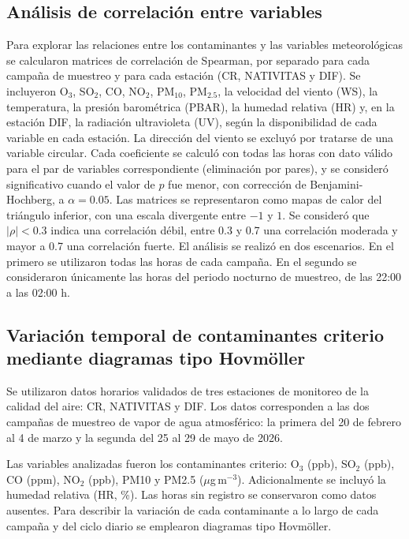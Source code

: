\subsection{Análisis de correlación entre variables}
\label{subsec:correlacion}

Para explorar las relaciones entre los contaminantes y las variables meteorológicas se 
calcularon matrices de correlación de Spearman, por separado para cada campaña de muestreo 
y para cada estación (CR, NATIVITAS y DIF). Se incluyeron O$_3$, SO$_2$, CO, NO$_2$,
PM$_{10}$, PM$_{2.5}$, la velocidad del viento (WS), la temperatura, la presión barométrica
(PBAR), la humedad relativa (HR) y, en la estación DIF, la radiación ultravioleta
(UV), según la disponibilidad de cada variable en cada estación. La dirección del 
viento se excluyó por tratarse de una variable circular. Cada coeficiente se calculó 
con todas las horas con dato válido para el par de variables correspondiente 
(eliminación por pares), y se consideró significativo cuando el valor de $p$ fue menor, con 
corrección de Benjamini-Hochberg, a $\alpha = 0.05$. Las matrices se representaron como mapas de 
calor del triángulo inferior, con una escala divergente entre $-1$ y $1$. Se consideró 
que $|\rho| < 0.3$ indica una correlación 
débil, entre 0.3 y 0.7 una correlación moderada y mayor a 0.7 una correlación fuerte.
El análisis se realizó en dos escenarios. En el primero se utilizaron todas 
las horas de cada campaña. En el segundo se consideraron únicamente las horas 
del periodo nocturno de muestreo, de las 22:00 a las 02:00 h. 

\subsection{Variación temporal de contaminantes criterio mediante diagramas tipo Hovmöller}
\label{sec:met_hovmoller}

Se utilizaron datos horarios validados de tres estaciones de monitoreo de la 
calidad del aire: CR, NATIVITAS y DIF. Los datos corresponden a las dos campañas de
muestreo de vapor de agua atmosférico: la primera del 20 de febrero al 4 de marzo 
y la segunda del 25 al 29 de mayo de 2026.

Las variables analizadas fueron los contaminantes criterio: O$_3$ (ppb), 
SO$_2$ (ppb), CO (ppm), NO$_2$ (ppb), PM10 y PM2.5 ($\mu$g\,m$^{-3}$). Adicionalmente 
se incluyó la humedad relativa (HR, \%). Las horas sin registro se conservaron como datos ausentes.
Para describir la variación de cada contaminante a lo largo de cada campaña 
y del ciclo diario se emplearon diagramas tipo Hovmöller. 

